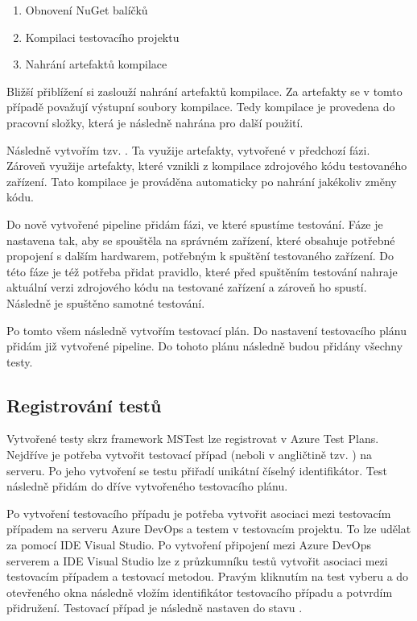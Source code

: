 \begin{enumerate}
    \item Obnovení NuGet balíčků 
    \item Kompilaci testovacího projektu
    \item Nahrání artefaktů kompilace 
\end{enumerate}

Bližší přiblížení si zaslouží nahrání artefaktů kompilace. Za artefakty se v tomto případě považují výstupní soubory kompilace. Tedy kompilace je provedena do pracovní složky, která je následně nahrána pro další použití. 

Následně vytvořím tzv. . Ta využije artefakty, vytvořené v předchozí fázi.
Zároveň využije artefakty, které vznikli z kompilace zdrojového kódu testovaného zařízení. Tato kompilace je prováděna automaticky po nahrání jakékoliv změny kódu.

Do nově vytvořené pipeline přidám fázi, ve které spustíme testování. Fáze je nastavena tak, aby se spouštěla na správném zařízení, které obsahuje potřebné propojení s dalším hardwarem, potřebným k spuštění testovaného zařízení. Do této fáze je též potřeba přidat pravidlo, které před spuštěním testování nahraje aktuální verzi zdrojového kódu na testované zařízení a zároveň ho spustí. Následně je spuštěno samotné testování.

Po tomto všem následně vytvořím testovací plán. Do nastavení testovacího plánu přidám již vytvořené pipeline. Do tohoto plánu následně budou přidány všechny testy. 

\subsection{Registrování testů}
Vytvořené testy skrz framework MSTest lze registrovat v Azure Test Plans. Nejdříve je potřeba vytvořit testovací případ (neboli v angličtině tzv. ) na serveru. Po jeho vytvoření se testu přiřadí unikátní číselný identifikátor. Test následně přidám do dříve vytvořeného testovacího plánu.

Po vytvoření testovacího případu je potřeba vytvořit asociaci mezi testovacím případem na serveru Azure DevOps a testem v testovacím projektu. To lze udělat za pomocí IDE Visual Studio. Po vytvoření připojení mezi Azure DevOps serverem a IDE Visual Studio lze z průzkumníku testů vytvořit asociaci mezi testovacím případem a testovací metodou. Pravým kliknutím na test vyberu  a do otevřeného okna následně vložím identifikátor testovacího případu a potvrdím přidružení. Testovací případ je následně nastaven do stavu .

